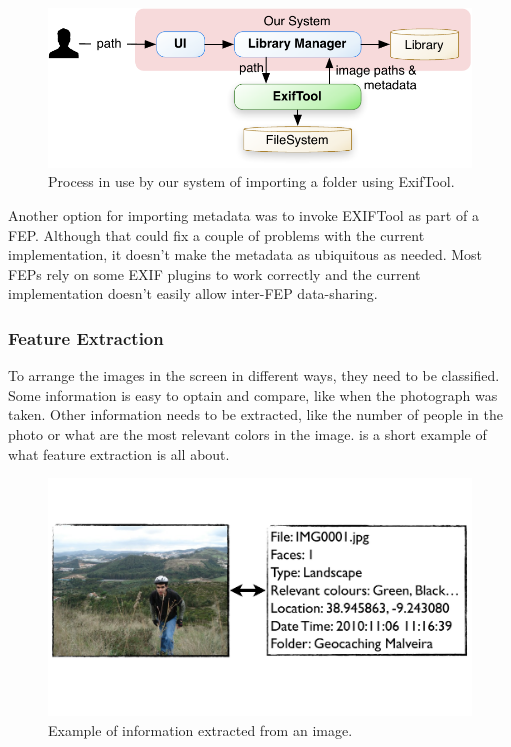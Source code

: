 \begin{figure}[ht]
	\centering
		\includegraphics[scale=0.6]{Figures/import.pdf}
	\caption{Process in use by our system of importing a folder using ExifTool.}
	\label{fig:arch:import}
\end{figure}

Another option for importing metadata was to invoke EXIFTool as part of a \ac{FEP}. Although that could fix a couple of problems with the current  implementation, it doesn’t make the metadata as ubiquitous as needed. Most \acp{FEP} rely on some \ac{EXIF} plugins to work correctly and the current implementation doesn’t easily allow inter-\ac{FEP} data-sharing.





\subsubsection{Feature Extraction} %
\label{ssub:FeatureExtraction}

To arrange the images in the screen in different ways, they need to be classified. Some information is easy to optain and compare, like when the photograph was taken. Other information needs to be extracted, like the number of people in the photo or what are the most relevant colors in the image.  is a short example of what feature extraction is all about.

\begin{figure}[ht]
	\centering
		\includegraphics[width=0.72\columnwidth]{Figures/fe.pdf}
	\caption{Example of information extracted from an image.}
	\label{fig:fe}
\end{figure}

